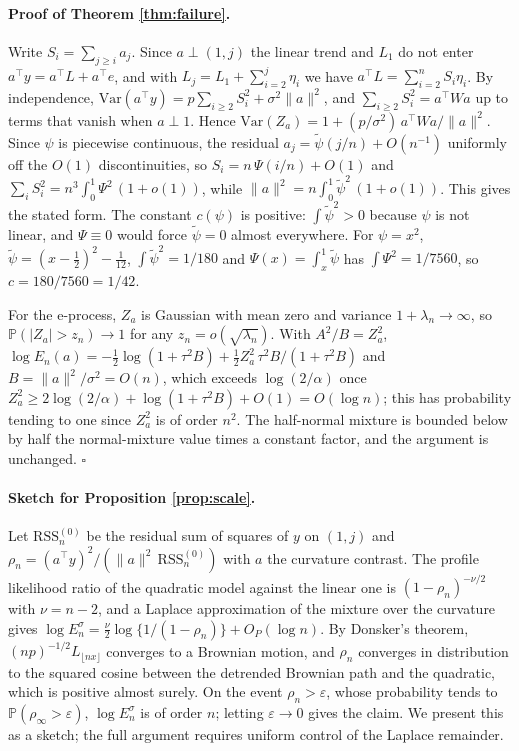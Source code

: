 \documentclass[11pt]{article}
\theoremstyle{plain}
\theoremstyle{definition}
\newcommand{\Prob}{\mathbb{P}}
\begin{document}
\paragraph{Proof of Theorem \ref{thm:failure}.} Write $S_i=\sum_{j\ge i}a_j$. Since $a\perp(1,j)$ the linear trend and $L_1$ do not enter $a^\top y=a^\top L+a^\top e$, and with $L_j=L_1+\sum_{i=2}^j\eta_i$ we have $a^\top L=\sum_{i=2}^nS_i\eta_i$. By independence, $\mathrm{Var}(a^\top y)=p\sum_{i\ge2}S_i^2+\sigma^2\|a\|^2$, and $\sum_{i\ge2}S_i^2=a^\top Wa$ up to terms that vanish when $a\perp1$. Hence $\mathrm{Var}(Z_a)=1+(p/\sigma^2)\,a^\top Wa/\|a\|^2$. Since $\psi$ is piecewise continuous, the residual $a_j=\tilde\psi(j/n)+O(n^{-1})$ uniformly off the $O(1)$ discontinuities, so $S_i=n\,\Psi(i/n)+O(1)$ and $\sum_iS_i^2=n^3\int_0^1\Psi^2\,(1+o(1))$, while $\|a\|^2=n\int_0^1\tilde\psi^2\,(1+o(1))$. This gives the stated form. The constant $c(\psi)$ is positive: $\int\tilde\psi^2>0$ because $\psi$ is not linear, and $\Psi\equiv0$ would force $\tilde\psi=0$ almost everywhere. For $\psi=x^2$, $\tilde\psi=(x-\tfrac12)^2-\tfrac1{12}$, $\int\tilde\psi^2=1/180$ and $\Psi(x)=\int_x^1\tilde\psi$ has $\int\Psi^2=1/7560$, so $c=180/7560=1/42$.

For the e-process, $Z_a$ is Gaussian with mean zero and variance $1+\lambda_n\to\infty$, so $\Prob(|Z_a|>z_n)\to1$ for any $z_n=o(\sqrt{\lambda_n})$. With $A^2/B=Z_a^2$, $\log E_n(a)=-\tfrac12\log(1+\tau^2B)+\tfrac12 Z_a^2\,\tau^2B/(1+\tau^2B)$ and $B=\|a\|^2/\sigma^2=O(n)$, which exceeds $\log(2/\alpha)$ once $Z_a^2\ge 2\log(2/\alpha)+\log(1+\tau^2B)+O(1)=O(\log n)$; this has probability tending to one since $Z_a^2$ is of order $n^2$. The half-normal mixture is bounded below by half the normal-mixture value times a constant factor, and the argument is unchanged. $\square$

\paragraph{Sketch for Proposition \ref{prop:scale}.} Let $\mathrm{RSS}^{(0)}_n$ be the residual sum of squares of $y$ on $(1,j)$ and $\rho_n=(a^\top y)^2/(\|a\|^2\,\mathrm{RSS}^{(0)}_n)$ with $a$ the curvature contrast. The profile likelihood ratio of the quadratic model against the linear one is $(1-\rho_n)^{-\nu/2}$ with $\nu=n-2$, and a Laplace approximation of the mixture over the curvature gives $\log E^\sigma_n=\tfrac\nu2\log\{1/(1-\rho_n)\}+O_P(\log n)$. By Donsker's theorem, $(np)^{-1/2}L_{\lfloor nx\rfloor}$ converges to a Brownian motion, and $\rho_n$ converges in distribution to the squared cosine between the detrended Brownian path and the quadratic, which is positive almost surely. On the event $\rho_n>\varepsilon$, whose probability tends to $\Prob(\rho_\infty>\varepsilon)$, $\log E^\sigma_n$ is of order $n$; letting $\varepsilon\to0$ gives the claim. We present this as a sketch; the full argument requires uniform control of the Laplace remainder.
\end{document}
